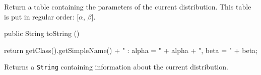 \begin{tabb}
   Return a table containing the parameters of the current distribution.
   This table is put in regular order: [$\alpha$, $\beta$].
\end{tabb}
\begin{hide}\begin{code}

   public String toString ()\begin{hide} {
      return getClass().getSimpleName() + " : alpha = " + alpha + ", beta = " + beta;
   }\end{hide}
\end{code}
\begin{tabb}
   Returns a \texttt{String} containing information about the current distribution.
\end{tabb}\end{hide}
\begin{code}\begin{hide}
}\end{hide}
\end{code}
